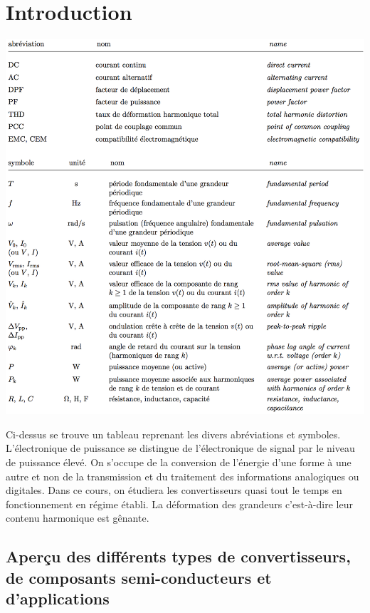 
\chapter{Introduction}
	
	\begin{center}
		\includegraphics[scale=0.65]{ch1/1}
		\label{table:1.1}
	\end{center}
	
	Ci-dessus se trouve un tableau reprenant les divers abréviations et symboles. 	L'électronique de puissance se distingue de l'électronique de signal par le niveau de puissance élevé. On s'occupe de la conversion de l'énergie d'une forme à une autre et non de la transmission et du traitement des informations analogiques ou digitales. Dans ce cours, on étudiera les convertisseurs quasi tout le temps en fonctionnement en régime établi. La déformation des grandeurs c'est-à-dire leur contenu harmonique est gênante. 
	
\section{Aperçu des différents types de convertisseurs, de composants semi-conducteurs et d'applications}

